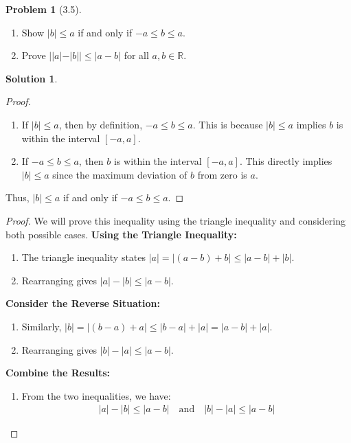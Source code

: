 \documentclass[12pt]{article}
\theoremstyle{definition} %
\newtheorem{solution}{Solution}
\newtheorem{problem}{Problem}
\theoremstyle{plain} %
\begin{document}
\begin{problem}[3.5]
    \begin{enumerate}
        \item Show $|b|\leq a$ if and only if $-a\leq b\leq a$.
        \item Prove $||a|-|b||\leq|a-b|$ for all $a,b \in \mathbb{R}$.
    \end{enumerate}
\end{problem}

\begin{solution}
 \begin{proof}
        \begin{enumerate}
            \item If $|b| \leq a$, then by definition, $-a \leq b \leq a$. This is because $|b| \leq a$ implies $b$ is within the interval $[-a, a]$.
            \item If $-a \leq b \leq a$, then $b$ is within the interval $[-a, a]$. This directly implies $|b| \leq a$ since the maximum deviation of $b$ from zero is $a$.
        \end{enumerate}
        Thus, $|b| \leq a$ if and only if $-a \leq b \leq a$. 
    \end{proof}
    \begin{proof}
        We will prove this inequality using the triangle inequality and considering both possible cases.
  \textbf{Using the Triangle Inequality:}
            \begin{enumerate}
                \item The triangle inequality states $|a| = |(a - b) + b| \leq |a - b| + |b|$.
                \item Rearranging gives $|a| - |b| \leq |a - b|$.
            \end{enumerate}
            
          \textbf{Consider the Reverse Situation:}
            \begin{enumerate}
                \item Similarly, $|b| = |(b - a) + a| \leq |b - a| + |a| = |a - b| + |a|$.
                \item Rearranging gives $|b| - |a| \leq |a - b|$.
            \end{enumerate}
            
             \textbf{Combine the Results:}
            \begin{enumerate}
                \item From the two inequalities, we have:
                \begin{align}
                |a| - |b| \leq |a - b| \quad \text{and} \quad |b| - |a| \leq |a - b|
                \end{align}
            \end{enumerate}
            

\end{proof}
\end{solution}
\end{document}
